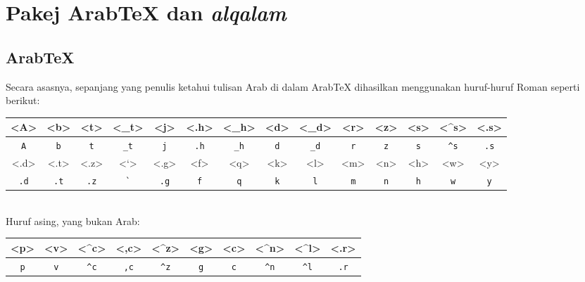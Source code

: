 \chapter{Pakej Arab\TeX{} dan \emph{alqalam}}

\section{Arab\TeX{}}

Secara asasnya, sepanjang yang penulis ketahui tulisan Arab di dalam Arab\TeX{} dihasilkan menggunakan huruf-huruf Roman seperti berikut:\\

\begin{minipage}{\linewidth}
\begin{center}
\begin{tabular}{|c|c|c|c|c|c|c|c|c|c|c|c|c|c|}
\hline
\rule[-6pt]{0pt}{16pt}
<A> & <b> & <t> & <_t> & <j> & <.h> & <_h> &
<d> & <_d> & <r> & <z> & <s> & <^s> & <.s> \\
\hline
\verb#A# & \verb#b# & \verb#t# & \verb#_t# & \verb#j# & \verb#.h# & \verb#_h# &
\verb#d# & \verb#_d# & \verb#r# & \verb#z# & \verb#s# & \verb#^s# & \verb#.s#\\
\hline
\hline
\rule[-7pt]{0pt}{17pt}
<.d> & <.t> & <.z> & <`> & <.g> & <f> & <q> &
<k> & <l> & <m> & <n> & <h> & <w> & <y> \\
\hline
\verb#.d# & \verb#.t# & \verb#.z# & \verb#`# & \verb#.g# & \verb#f# & \verb#q# &
\verb#k# & \verb#l# & \verb#m# & \verb#n# & \verb#h# & \verb#w# & \verb#y# \\
\hline
\end{tabular}
\end{center}
\end{minipage}\\

Huruf asing, yang bukan Arab:\\
\bigskip
\begin{minipage}{\linewidth}
\begin{center}
\begin{tabular}{|c|c|c|c|c|c|c|c|c|c|}
\hline
<p> & <v> & <^c> & <,c> & <^z> & <g> & <c> & <^n> & <^l> & <.r> \\
\hline
\verb#p# & \verb#v# & \verb#^c# & \verb#,c# & \verb#^z# & \verb#g# &
\verb#c# & \verb#^n# & \verb#^l# & \verb#.r# \\
\hline
\end{tabular}
\end{center}
\label{arab-rujuk}
\end{minipage}

